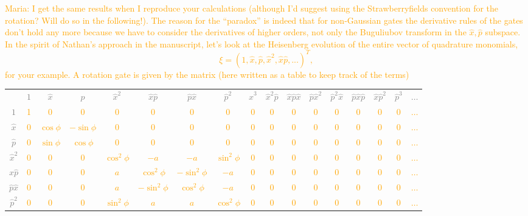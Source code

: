 \documentclass[aps,pra,10pt,onecolumn,notitlepage, groupedaddress,nofootinbib]{revtex4-1}
\theoremstyle{plain}
\newcommand{\x}{\hat{x}}
\newcommand{\p}{\hat{p}}
\newcommand{\maria}[1]{\textcolor{orange}{Maria: #1}}
\begin{document}
\maria{I get the same results when I reproduce your calculations (although I'd suggest using the Strawberryfields convention for the rotation? Will do so in the following!). The reason for the ``paradox'' is indeed that for non-Gaussian gates the derivative rules of the gates don't hold any more because we have to consider the derivatives of higher orders, not only the Buguliubov transform in the $\x, \p$ subspace.
In the spirit of Nathan's approach in the manuscript, let's look at the Heisenberg evolution of the entire vector of quadrature monomials,
\[ \xi = (1, \x, \p , \x^2, \x \p,...)^T,\]
for your example. A rotation gate is given by the matrix (here written as a table to keep track of the terms)\\
\begin{center}
\def\arraystretch{1.5}
\footnotesize
\begin{tabular}{ccccccccccccccccc}
& \textcolor{gray}{$1$} & \textcolor{gray}{$\hat{x}$} & \textcolor{gray}{$\hat{p}$} & \textcolor{gray}{$\hat{x}^2$} & \textcolor{gray}{$\hat{x}\hat{p}$} & \textcolor{gray}{$\hat{p}\hat{x}$} & \textcolor{gray}{$\hat{p}^2$} & \textcolor{gray}{$\hat{x}^3$} & \textcolor{gray}{$\hat{x}^2\hat{p}$} & \textcolor{gray}{$\hat{x}\hat{p}\hat{x}$} & \textcolor{gray}{$\hat{p}\hat{x}^2$} &  \textcolor{gray}{$\hat{p}^2\hat{x}$} &  \textcolor{gray}{$\hat{p}\hat{x}\hat{p}$} &  \textcolor{gray}{$\hat{x}\hat{p}^2$} & \textcolor{gray}{$\hat{p}^3$} & \textcolor{gray}{$\hdots$} \\
\textcolor{gray}{$1$} & 1 & 0 & 0 & 0 & 0 & 0 & 0 & 0 & 0 & 0 & 0 & 0 & 0 & 0 & 0 &  $\hdots$\\
\textcolor{gray}{$\hat{x}$} & 0 & $\cos \phi$ & $-\sin \phi$ & 0 & 0 & 0 & 0 & 0 & 0 & 0 & 0 & 0 & 0 & 0  & 0 & $\hdots$\\
\textcolor{gray}{$\hat{p}$} & 0 & $\sin \phi$ & $ \cos \phi$ & 0 & 0 & 0 & 0 & 0 & 0  & 0 & 0 & 0 & 0 & 0 & 0 & $\hdots$\\
\textcolor{gray}{$\hat{x}^2$} & 0 & 0 & 0 & $\cos^2 \phi$ & $- a$ & $- a$  & $\sin^2 \phi$ &  0 & 0 & 0 & 0 & 0 & 0 & 0 & 0 & $\hdots$\\
\textcolor{gray}{$\hat{x}\hat{p}$} & 0 & 0 & 0 & $ a$ & $\cos^2 \phi$ & $-\sin^2 \phi$  & $-a$  & 0 & 0 & 0 & 0 & 0 & 0& 0 & 0 & $\hdots$\\
\textcolor{gray}{$\hat{p}\hat{x}$} & 0 & 0 & 0 & $a$ & $-\sin^2 \phi$  & $\cos^2 \phi$ & $-a$ &  0 & 0 & 0 & 0 & 0 & 0& 0 & 0 & $\hdots$\\
\textcolor{gray}{$\hat{p}^2$} & 0 & 0 & 0 & $\sin^2 \phi$ & $a$ & $a$  & $\cos^2 \phi$ & 0 & 0 & 0 & 0& 0 & 0 & 0 & 0 & $\hdots$\\

\end{tabular}
\end{center}}
\end{document}
